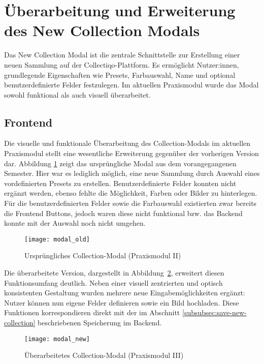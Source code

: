 \section{Überarbeitung und Erweiterung des New Collection Modals}\label{sec:uberarbeitung-und-erweiterung-des-new-collection-modals}

Das New Collection Modal ist die zentrale Schnittstelle zur Erstellung einer neuen Sammlung auf der Collectiqo-Plattform.
Es ermöglicht Nutzer:innen, grundlegende Eigenschaften wie Presets, Farbauswahl, Name und optional benutzerdefinierte Felder festzulegen.
Im aktuellen Praxismodul wurde das Modal sowohl funktional als auch visuell überarbeitet.

%
\subsection{Frontend}\label{subsec:new-collection-frontend}

Die visuelle und funktionale Überarbeitung des Collection-Modals im aktuellen Praxismodul stellt eine wesentliche Erweiterung gegenüber der vorherigen Version dar.
Abbildung \ref{fig:modal-old} zeigt das ursprüngliche Modal aus dem vorangegangenen Semester.
Hier war es lediglich möglich, eine neue Sammlung durch Auswahl eines vordefinierten Presets zu erstellen.
Benutzerdefinierte Felder konnten nicht ergänzt werden, ebenso fehlte die Möglichkeit, Farben oder Bilder zu hinterlegen.
Für die benutzerdefinierten Felder sowie die Farbauswahl existierten zwar bereits die Frontend Buttons, jedoch waren diese nicht funktional bzw. das Backend konnte mit der Auswahl noch nicht umgehen.

\begin{figure}[H]
    \centering
    \texttt{[image: modal\_old]}
    \caption{Ursprüngliches Collection-Modal (Praxismodul II)}
    \label{fig:modal-old}
\end{figure}

Die überarbeitete Version, dargestellt in Abbildung~\ref{fig:modal-new}, erweitert diesen Funktionsumfang deutlich.
Neben einer visuell zentrierten und optisch konsistenten Gestaltung wurden mehrere neue Eingabemöglichkeiten ergänzt: Nutzer können nun eigene Felder definieren sowie ein Bild hochladen.
Diese Funktionen korrespondieren direkt mit der im Abschnitt \ref{subsubsec:save-new-collection} beschriebenen Speicherung im Backend.

\begin{figure}[H]
    \centering
    \texttt{[image: modal\_new]}
    \caption{Überarbeitetes Collection-Modal (Praxismodul III)}
    \label{fig:modal-new}
\end{figure}

